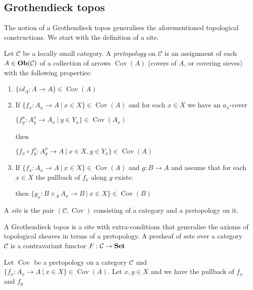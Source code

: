 \documentclass[a4paper]{article}
\theoremstyle{defin}
\theoremstyle{theorem}
\theoremstyle{claim}
\theoremstyle{prop}
\theoremstyle{lemma}
\theoremstyle{fact}
\theoremstyle{ex}
\theoremstyle{col}
\begin{document}
\subsection{Grothendieck topos}

The notion of a Grothendieck topos generalises the aforementioned topological constructions. We start with the definition of a site.

Let $\mathcal{C}$ be a locally small category. A \emph{pretopology} on $\mathcal{C}$ is an assignment of each $A \in {\bf Ob}(\mathcal{C})$ of a collection of arrows $\operatorname{Cov}(A)$ (covers of $A$, or covering sieves) with the following properties:
\begin{enumerate}
\item $\{ id_A : A \to A \} \in \operatorname{Cov}(A)$
\item If $\{ f_x : A_x \to A \: | \: x \in X \} \in \operatorname{Cov}(A)$ and for each $x \in X$ we have an $a_x$-cover
\begin{center}
$\{ f_y^x : A_y^x \to A_x \: | \: y \in Y_x \} \in \operatorname{Cov}(A_x)$
\end{center}
then
\begin{center}
$\{ f_x \circ f_y^x : A^x_y \to A \: | \: x \in X, y \in Y_x\} \in  \operatorname{Cov}(A)$
\end{center}
\item If $\{ f_x : A_x \to A \: | \: x \in X \} \in \operatorname{Cov}(A)$ and $g : B \to A$ and assume that for each $x \in X$ the pullback of $f_x$ along $g$ exists:

then $\{ g_x : B \times_A A_x \to B \:| \: x \in X\} \in \operatorname{Cov}(B)$
\end{enumerate}

A \emph{site} is the pair $(\mathcal{C}, \operatorname{Cov})$ consisting of a category and a pretopology on it.

A Grothendieck topos is a site with extra-conditions that generalise the axioms of topological sheaves in terms of a pretopology. A presheaf of sets over a category $\mathcal{C}$ is a contravariant functor $F : \mathcal{C} \to {\bf Set}$

Let $\operatorname{Cov}$ be a pretopology on a category $\mathcal{C}$ and $\{ f_x : A_x \to A \: | \: x \in X \} \in \operatorname{Cov}(A)$. Let $x, y \in X$ and we have the pullback of $f_x$ and $f_y$
\end{document}
